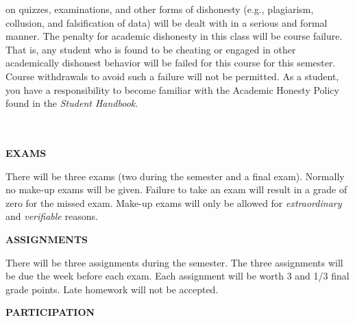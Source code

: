 \documentclass{article}
\begin{document}
on quizzes, examinations, and other forms of dishonesty (e.g., plagiarism, collusion, and
falsification of data) will be dealt with in a serious and formal manner. The penalty for academic
dishonesty in this class will be course failure. That is, any student who is found to be cheating
or engaged in other academically dishonest behavior will be failed for this course for this
semester. Course withdrawals to avoid such a failure will not be permitted. As a student, you
have a responsibility to become familiar with the Academic Honesty Policy found in the {\it Student
 Handbook}.\\
\\
\\

\begin{center}
{\bf EXAMS} 
\end{center}
There will be three exams (two during the semester and a final exam). Normally no make-up exams will be given.  Failure to take an exam will result in a grade of zero for the missed exam.  Make-up exams will only be allowed for {\it extraordinary} and {\it verifiable} reasons.\\
\begin{center}
{\bf ASSIGNMENTS} 
\end{center}
There will be three assignments during the semester. The three assignments will be due the week before each exam. Each assignment will be worth 3 and 1/3 final grade points. Late homework will not be accepted.
\begin{center}
{\bf PARTICIPATION} 
\end{center}
\end{document}
